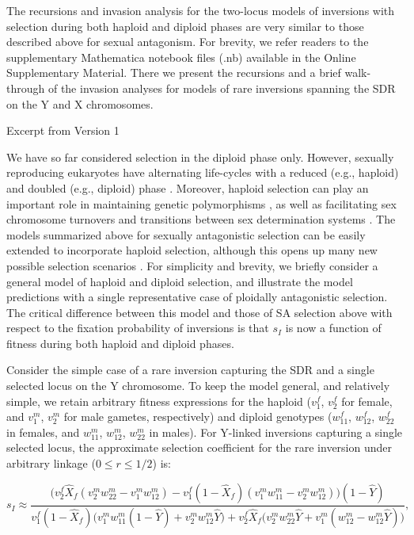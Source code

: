 \documentclass{article}
\newcommand\hl[1]{%
  \bgroup
  \hskip0pt\color{blue!80!black}%
  #1%
  \egroup
}
\begin{document}
The recursions and invasion analysis for the two-locus models of inversions with selection during both haploid and diploid phases are very similar to those described above for sexual antagonism. For brevity, we refer readers to the supplementary Mathematica notebook files (.nb) available in the Online Supplementary Material. There we present the recursions and a brief walk-through of the invasion analyses for models of rare inversions spanning the SDR on the Y and X chromosomes.
\bigskip

\hl{Excerpt from Version 1}
We have so far considered selection in the diploid phase only. However, sexually reproducing eukaryotes have alternating life-cycles with a reduced (e.g., haploid) and doubled (e.g., diploid) phase \citep{Strasburger1894, Roe1975}. Moreover, haploid selection can play an important role in maintaining genetic polymorphisms \citep{ImmlerOtto2011}, as well as facilitating sex chromosome turnovers \citep{OttoScottOsmond2018} and transitions between sex determination systems \citep{MuralidharVeller2018}. The models summarized above for sexually antagonistic selection can be easily extended to incorporate haploid selection, although this opens up many new possible selection scenarios \citep{ImmlerOtto2011, OttoScottOsmond2018}. For simplicity and brevity, we briefly consider a general model of haploid and diploid selection, and illustrate the model predictions with a single representative case of ploidally antagonistic selection. The critical difference between this model and those of SA selection above with respect to the fixation probability of inversions is that $s_I$ is now a function of fitness during both haploid and diploid phases. 

Consider the simple case of a rare inversion capturing the SDR and a single selected locus on the Y chromosome. To keep the model general, and relatively simple, we retain arbitrary fitness expressions for the haploid ($v^{f}_{1}$, $v^{f}_{2}$ for female, and $v^{m}_{1}$, $v^{m}_{2}$ for male gametes, respectively) and diploid genotypes ($w^{f}_{11}$, $w^{f}_{12}$, $w^{f}_{22}$ in females, and $w^{m}_{11}$, $w^{m}_{12}$, $w^{m}_{22}$ in males). For Y-linked inversions capturing a single selected locus, the approximate selection coefficient for the rare inversion under arbitrary linkage ($0 \leq r \leq 1/2$) is:

\begin{equation}\label{eq:sI-HapDip-2LocLinked}
	s_I \approx \frac{\big( v^{f}_{2} \hat{X}_f (v^{m}_{2} w^{m}_{22} -v^{m}_{1} w^{m}_{12} ) - v^{f}_{1} (1 - \hat{X}_f) (v^{m}_{1} w^{m}_{11} - v^{m}_{2} w^{m}_{12}) \big) (1 - \hat{Y})} {v^{f}_{1} (1 - \hat{X}_f) \big( v^{m}_{1} w^{m}_{11} (1 - \hat{Y}) + v^{m}_{2} w^{m}_{12} \hat{Y} \big) + v^{f}_{2} \hat{X}_f \big( v^{m}_{2} w^{m}_{22} \hat{Y} + v^{m}_{1} (w^{m}_{12} - w^{m}_{12} \hat{Y}) \big)},
\end{equation}
\end{document}
